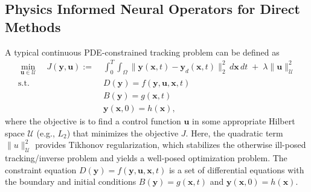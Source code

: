\documentclass[final,1p,times]{elsarticle}
\theoremstyle{plain} %
\theoremstyle{definition} %
\theoremstyle{remark} %
\begin{document}
\subsection{Physics Informed Neural Operators for Direct Methods}
A typical continuous PDE-constrained tracking problem can be defined as
\begin{equation}\label{eq:pde_tracking_cont}
\begin{aligned}
\min_{\mathbf{u}\in\mathcal{U}}\quad 
J(\mathbf{y},\mathbf{u})
:=\;& \int_{0}^{T}\int_{\Omega}
\|\mathbf{y}(\mathbf{x},t)-\mathbf{y}_d(\mathbf{x},t)\|_2^2\,d\mathbf{x}\,dt
\;+\;\lambda\|\mathbf{u}\|_{\mathcal{U}}^2 \\
\text{s.t.}\quad 
& D(\mathbf{y}) = f(\mathbf{y},\mathbf{u},\mathbf{x},t) \\
& B(\mathbf{y}) = g(\mathbf{x},t) \\
& \mathbf{y}(\mathbf{x},0) = h(\mathbf{x}),
\end{aligned}
\end{equation}
%
where the objective is to find a control function $\mathbf{u}$ in some appropriate Hilbert space $\mathcal{U}$ (e.g., $L_2$) that minimizes the objective $J$. Here, the quadratic term $\|u\|_\mathcal{U}^2$ provides Tikhonov regularization, which stabilizes the otherwise ill-posed tracking/inverse problem and yields a well-posed optimization problem. The constraint equation $D(\mathbf{y}) 
= f(\mathbf{y}, \mathbf{u}, \mathbf{x}, t)$ is a set of differential equations with the boundary and initial conditions $B(\mathbf{y})=g(\mathbf{x},t)$ and $\mathbf{y}(\mathbf{x},0)=h(\mathbf{x})$.
\end{document}
